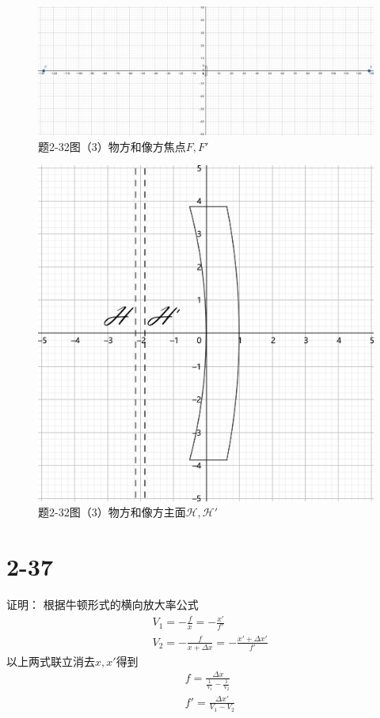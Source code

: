 \documentclass[10pt,a4paper]{article}
\theoremstyle{remark}
\begin{document}
\begin{figure}[h]
\centering
\includegraphics[scale=.2]{OpticsHomework_3Problem_2-32_3(tailored&marked).png}
\caption{题2-32图（3）物方和像方焦点$F,F'$}\label{OpticsHomework_3Problem2-32_3(tailored&marked)}
\end{figure}
\begin{figure}[h]
\centering
\includegraphics[scale=.3]{OpticsHomework_3Problem_2-32_3(enlarged&tailored&marked).png}
\caption{题2-32图（3）物方和像方主面$\mathscr{H},\mathscr{H}'$}\label{OpticsHomework_3Problem2-32_3(enlarged&tailored&marked)}
\end{figure}
\section*{2-37}证明：
根据牛顿形式的横向放大率公式
\begin{align*}
&V_1 = -\frac{f}{x} = -\frac{x'}{f'}\\
&V_2 = -\frac{f}{x + \Delta x} = -\frac{x' + \Delta x'}{f'}
\end{align*}
以上两式联立消去$x,x'$得到
\begin{align*}
&f = \frac{\Delta x}{\frac{1}{V_1} - \frac{1}{V_2}}\\
&f' = \frac{\Delta x'}{V_1 - V_2}
\end{align*}
\end{document}
